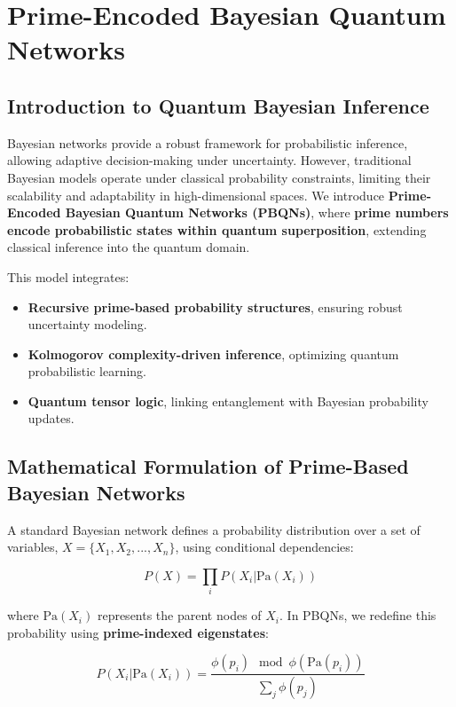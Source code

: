\documentclass{article}
\theoremstyle{plain}
\theoremstyle{plain}
\theoremstyle{definition}
\theoremstyle{remark}
\begin{document}
\section{Prime-Encoded Bayesian Quantum Networks}

\subsection{Introduction to Quantum Bayesian Inference}

Bayesian networks provide a robust framework for probabilistic inference, allowing adaptive decision-making under uncertainty. However, traditional Bayesian models operate under classical probability constraints, limiting their scalability and adaptability in high-dimensional spaces. We introduce \textbf{Prime-Encoded Bayesian Quantum Networks (PBQNs)}, where \textbf{prime numbers encode probabilistic states within quantum superposition}, extending classical inference into the quantum domain.

This model integrates:
\begin{itemize}
    \item \textbf{Recursive prime-based probability structures}, ensuring robust uncertainty modeling.
    \item \textbf{Kolmogorov complexity-driven inference}, optimizing quantum probabilistic learning.
    \item \textbf{Quantum tensor logic}, linking entanglement with Bayesian probability updates.
\end{itemize}

\subsection{Mathematical Formulation of Prime-Based Bayesian Networks}

A standard Bayesian network defines a probability distribution over a set of variables, $X = \{X_1, X_2, ..., X_n\}$, using conditional dependencies:

\begin{equation}
P(X) = \prod_{i} P(X_i | \text{Pa}(X_i))
\end{equation}

where $\text{Pa}(X_i)$ represents the parent nodes of $X_i$. In PBQNs, we redefine this probability using \textbf{prime-indexed eigenstates}:

\begin{equation}
P(X_i | \text{Pa}(X_i)) = \frac{\phi(p_i) \mod \phi(\text{Pa}(p_i))}{\sum_{j} \phi(p_j)}
\end{equation}
\end{document}
